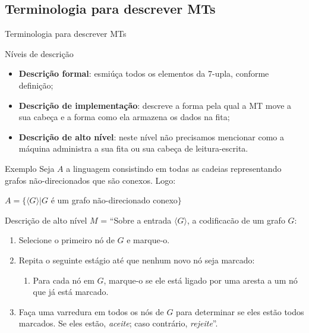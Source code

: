 \documentclass[xcolor=dvipsnames,table]{beamer}
\begin{document}
	\subsection{Terminologia para descrever MTs}
	\begin{frame}{Terminologia para descrever MTs}
		\begin{block}{Níveis de descrição}
			\begin{itemize}
				\item {\bf Descrição formal}: esmiúça todos os elementos da 7-upla, conforme definição;
				\item {\bf Descrição de implementação}: descreve a forma pela qual a MT move a sua cabeça e a forma como ela armazena os dados na fita;
				\item {\bf Descrição de alto nível}: neste nível não precisamos mencionar como a máquina administra a sua fita ou sua cabeça de leitura-escrita.
			\end{itemize}
		\end{block}
	\end{frame}
	
	\begin{frame}[shrink]{Exemplo}
		Seja $A$ a linguagem consistindo em todas as cadeias representando grafos não-direcionados que são conexos. Logo:
		\begin{center}
			$A = \{\langle G \rangle | G$ é um grafo não-direcionado conexo$\}$
		\end{center}	
		\begin{block}{Descrição de alto nível}
			$M$ = ``Sobre a entrada $\langle G \rangle$, a codificacão de um grafo $G$:
			\begin{enumerate}
				\item Selecione o primeiro nó de $G$ e marque-o.
				\item Repita o seguinte estágio até que nenhum novo nó seja marcado:
					\begin{enumerate}
						\item Para cada nó em $G$, marque-o se ele está ligado por uma aresta a um nó que já está marcado.
					\end{enumerate}
				\item Faça uma varredura em todos os nós de $G$ para determinar se eles estão todos marcados. Se eles estão, {\it aceite}; caso contrário, {\it rejeite}''.
			\end{enumerate}
		\end{block}
	\end{frame}
	
\end{document}
